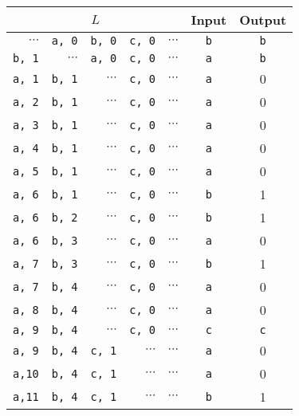 \documentclass{article}
\begin{document}
\thispagestyle{empty}
\begin{tabular}{rrrrrcc}
    \multicolumn{5}{c}{$L$} & Input & Output \\
    \hline
    $\cdots$ & {\tt a, {\rm 0}} & {\tt b, {\rm 0}} & {\tt c, {\rm 0}} & $\cdots$ & {\tt b} & {\tt b}\\
    {\tt b, {\rm 1}} &         $\cdots$ & {\tt a, {\rm 0}} & {\tt c, {\rm 0}} & $\cdots$ & {\tt a} & {\tt b}\\
    {\tt a, {\rm 1}} & {\tt b, {\rm 1}} &         $\cdots$ & {\tt c, {\rm 0}} & $\cdots$ & {\tt a} & 0\\
    {\tt a, {\rm 2}} & {\tt b, {\rm 1}} &         $\cdots$ & {\tt c, {\rm 0}} & $\cdots$ & {\tt a} & 0\\
    {\tt a, {\rm 3}} & {\tt b, {\rm 1}} &         $\cdots$ & {\tt c, {\rm 0}} & $\cdots$ & {\tt a} & 0\\
    {\tt a, {\rm 4}} & {\tt b, {\rm 1}} &         $\cdots$ & {\tt c, {\rm 0}} & $\cdots$ & {\tt a} & 0\\
    {\tt a, {\rm 5}} & {\tt b, {\rm 1}} &         $\cdots$ & {\tt c, {\rm 0}} & $\cdots$ & {\tt a} & 0\\
    {\tt a, {\rm 6}} & {\tt b, {\rm 1}} &         $\cdots$ & {\tt c, {\rm 0}} & $\cdots$ & {\tt b} & 1\\
    {\tt a, {\rm 6}} & {\tt b, {\rm 2}} &         $\cdots$ & {\tt c, {\rm 0}} & $\cdots$ & {\tt b} & 1\\
    {\tt a, {\rm 6}} & {\tt b, {\rm 3}} &         $\cdots$ & {\tt c, {\rm 0}} & $\cdots$ & {\tt a} & 0\\
    {\tt a, {\rm 7}} & {\tt b, {\rm 3}} &         $\cdots$ & {\tt c, {\rm 0}} & $\cdots$ & {\tt b} & 1\\
    {\tt a, {\rm 7}} & {\tt b, {\rm 4}} &         $\cdots$ & {\tt c, {\rm 0}} & $\cdots$ & {\tt a} & 0\\
    {\tt a, {\rm 8}} & {\tt b, {\rm 4}} &         $\cdots$ & {\tt c, {\rm 0}} & $\cdots$ & {\tt a} & 0\\
    {\tt a, {\rm 9}} & {\tt b, {\rm 4}} &         $\cdots$ & {\tt c, {\rm 0}} & $\cdots$ & {\tt c} & {\tt c}\\
    {\tt a, {\rm 9}} & {\tt b, {\rm 4}} & {\tt c, {\rm 1}} &         $\cdots$ & $\cdots$ & {\tt a} & 0\\
    {\tt a,{\rm 10}} & {\tt b, {\rm 4}} & {\tt c, {\rm 1}} &         $\cdots$ & $\cdots$ & {\tt a} & 0\\
    {\tt a,{\rm 11}} & {\tt b, {\rm 4}} & {\tt c, {\rm 1}} &         $\cdots$ & $\cdots$ & {\tt b} & 1
  \end{tabular}
\end{document}
